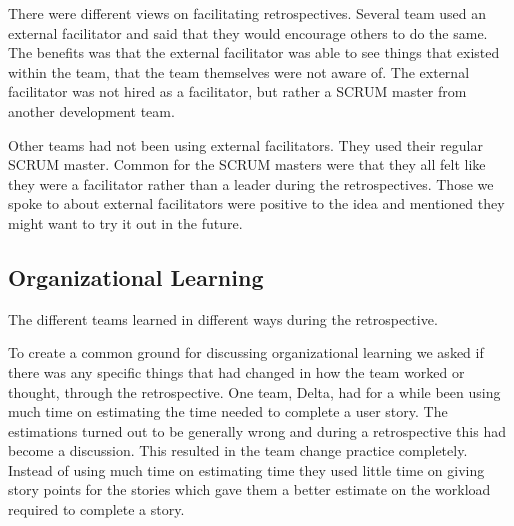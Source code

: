 \label{question-10}
There were different views on facilitating retrospectives. Several team used an external facilitator and said that they would encourage others to do the same. The benefits was that the external facilitator was able to see things that existed within the team, that the team themselves were not aware of. The external facilitator was not hired as a facilitator, but rather a SCRUM master from another development team.

Other teams had not been using external facilitators. They used their regular SCRUM master. Common for the SCRUM masters were that they all felt like they were a facilitator rather than a leader during the retrospectives. Those we spoke to about external facilitators were positive to the idea and mentioned they might want to try it out in the future. 

\begin{table}[!h]
	\begin{center}
	\caption{Usage of external facilitator}
	\label{table:external-facilitator}
	\end{center}
\end{table}

\subsection{Organizational Learning} %
\label{sub:organizational_learning}
The different teams learned in different ways during the retrospective.

\label{question-11}
To create a common ground for discussing organizational learning we asked if there was any specific things that had changed in how the team worked or thought, through the retrospective. One team, Delta, had for a while been using much time on estimating the time needed to complete a user story. The estimations turned out to be generally wrong and during a retrospective this had become a discussion. This resulted in the team change practice completely. Instead of using much time on estimating time they used little time on giving story points for the stories which gave them a better estimate on the workload required to complete a story. 


